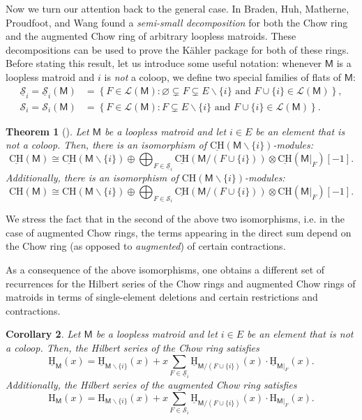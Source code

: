 \documentclass[11pt, a4paper, english]{amsart}
\theoremstyle{teoremas}
\newtheorem{theorem}{Theorem}[section]
\newtheorem{corollary}[theorem]{Corollary}
\theoremstyle{definition}
\newcommand{\M}{\mathsf{M}}
\renewcommand{\H}{\mathrm{H}}
\newcommand{\CH}{\mathrm{CH}}
\newcommand{\uH}{\underline{\mathrm{H}}}
\newcommand{\uCH}{\underline{\mathrm{CH}}}
\begin{document}
Now we turn our attention back to the general case. In \cite{semismall} Braden, Huh, Matherne, Proudfoot, and Wang found a \textit{semi-small decomposition} for both the Chow ring and the augmented Chow ring of arbitrary loopless matroids. These decompositions can be used to prove the K\"ahler package for both of these rings. Before stating this result, let us introduce some useful notation: whenever $\M$ is a loopless matroid and $i$ is \emph{not} a coloop, we define two special families of flats of $\M$:
    \begin{align}
        \underline{\mathscr{S}}_i = \underline{\mathscr{S}}_i(\M) &= \left\{ F \in \mathcal{L}(\M): \varnothing \subsetneq F\subsetneq E\smallsetminus\{i\} \text{ and } F\cup\{i\}\in \mathcal{L}(\M)\right\},\nonumber\\
        \mathscr{S}_i = \mathscr{S}_i(\M) &=  \left\{ F \in \mathcal{L}(\M):  F\subsetneq E\smallsetminus\{i\} \text{ and } F\cup\{i\}\in \mathcal{L}(\M)\right\}.\label{eq:family_S_i}
    \end{align}

\begin{theorem}[{\cite[Theorems 1.2 and 1.5]{semismall}}]\label{thm:semismall-decompositions}
    Let $\M$ be a loopless matroid and let $i\in E$ be an element that is not a coloop. Then, there is an isomorphism of $\uCH(\M\smallsetminus\{i\})$-modules:
    \[ \uCH(\M) \cong \uCH(\M\smallsetminus\{i\}) \oplus \bigoplus_{F\in \underline{\mathscr{S}}_i} \uCH\left(\M/{\left(F\cup\{i\}\right)}\right)\otimes \uCH(\M|_F)[-1]. \]
    Additionally, there is an isomorphism of $\CH(\M\smallsetminus\{i\})$-modules:
    \[ \CH(\M) \cong \CH(\M\smallsetminus\{i\}) \oplus \bigoplus_{F\in \mathscr{S}_i} \uCH\left(\M/{\left(F\cup\{i\}\right)}\right)\otimes \CH(\M|_F)[-1]. \]
\end{theorem}


We stress the fact that in the second of the above two isomorphisms, i.e. in the case of augmented Chow rings, the terms appearing in the direct sum depend on the Chow ring (as opposed to \emph{augmented}) of certain contractions. 

As a consequence of the above isomorphisms, one obtains a different set of recurrences for the Hilbert series of the Chow rings and augmented Chow rings of matroids in terms of single-element deletions and certain restrictions and contractions.

\begin{corollary}\label{coro:recursion-hilbert-chow}
    Let $\M$ be a loopless matroid and let $i\in E$ be an element that is not a coloop. Then, the Hilbert series of the Chow ring satisfies
    \[ \uH_{\M}(x) = \uH_{\M\smallsetminus\{i\}}(x) + x \sum_{F\in \underline{\mathscr{S}}_i} \uH_{\M/{(F\cup\{i\})}}(x) \cdot \uH_{\M|_F}(x).\]
    Additionally, the Hilbert series of the augmented Chow ring satisfies
    \[ \H_{\M}(x) = \H_{\M\smallsetminus\{i\}}(x) + x \sum_{F\in \mathscr{S}_i} \uH_{\M/{(F\cup\{i\})}}(x) \cdot \H_{\M|_F}(x).\]
\end{corollary}
\end{document}
